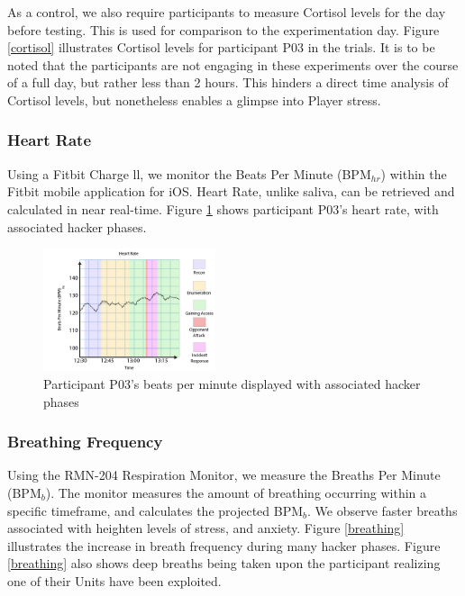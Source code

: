 \documentclass[10pt, titlepage, twocolumn]{article}
\newcommand{\ii}{\indent\indent}
\begin{document}
As a control, we also require participants to measure Cortisol levels for the day before testing. This is used for comparison to the experimentation day. Figure \ref{cortisol} illustrates Cortisol levels for participant P03 in the trials. It is to be noted that the participants are not engaging in these experiments over the course of a full day, but rather less than 2 hours. This hinders a direct time analysis of Cortisol levels, but nonetheless enables a glimpse into Player stress.

\subsubsection{Heart Rate}
\ii
Using a Fitbit Charge ll, we monitor the Beats Per Minute (BPM\(_{hr}\)) within the Fitbit mobile application for iOS. Heart Rate, unlike saliva, can be retrieved and calculated in near real-time. Figure \ref{heartrate} shows participant P03's heart rate, with associated hacker phases.

\begin{figure}[ht]
\centering
	\includegraphics[width=0.45\textwidth]{heartrate}
	\caption{Participant P03's beats per minute displayed with associated hacker phases}
	\label{heartrate}
\end{figure}


\subsubsection{Breathing Frequency}
\ii
Using the RMN-204 Respiration Monitor, we measure the Breaths Per Minute (BPM\(_b\)). The monitor measures the amount of breathing occurring within a specific timeframe, and calculates the projected BPM\(_b\). We observe faster breaths associated with heighten levels of stress, and anxiety. Figure \ref{breathing} illustrates the increase in breath frequency during many hacker phases. Figure \ref{breathing} also shows deep breaths being taken upon the participant realizing one of their Units have been exploited.
\end{document}
